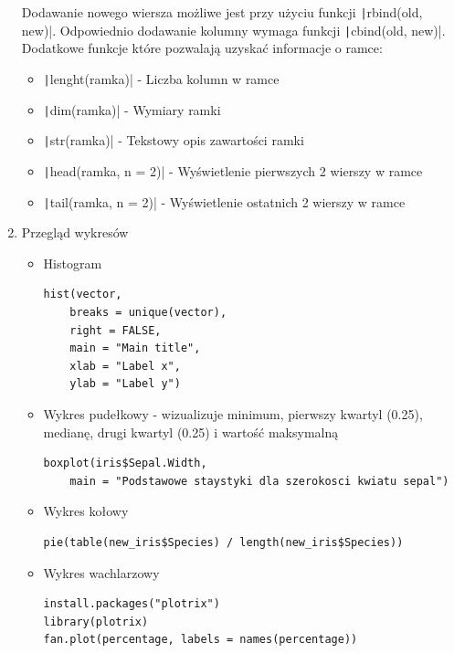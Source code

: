 \documentclass[11pt]{article}
\begin{document}
\begin{enumerate}
        Dodawanie nowego wiersza możliwe jest przy użyciu funkcji \texttt|rbind(old, new)|.
        Odpowiednio dodawanie kolumny wymaga funkcji \texttt|cbind(old, new)|. \\
        Dodatkowe funkcje które pozwalają uzyskać informacje o ramce:
        \begin{itemize}
        	\item \texttt|lenght(ramka)| - Liczba kolumn w ramce
        	\item \texttt|dim(ramka)| - Wymiary ramki
        	\item \texttt|str(ramka)| - Tekstowy opis zawartości ramki
        	\item \texttt|head(ramka, n = 2)| - Wyświetlenie pierwszych 2 wierszy w ramce
        	\item \texttt|tail(ramka, n = 2)| - Wyświetlenie ostatnich 2 wierszy w ramce
        \end{itemize}
        \clearpage
        \item Przegląd wykresów
        \begin{itemize}
        	\item Histogram 
        	\begin{verbatim}
hist(vector,
	breaks = unique(vector),
	right = FALSE, 
	main = "Main title", 
	xlab = "Label x", 
	ylab = "Label y")
        	\end{verbatim}
        	
        	\item Wykres pudełkowy - wizualizuje minimum, pierwszy kwartyl (0.25), medianę, drugi kwartyl (0.25) i wartość maksymalną
        	\begin{verbatim}
boxplot(iris$Sepal.Width,
	main = "Podstawowe staystyki dla szerokosci kwiatu sepal")
        	\end{verbatim}
        	
        	\item Wykres kołowy
        	\begin{verbatim}
pie(table(new_iris$Species) / length(new_iris$Species))
        	\end{verbatim}
        	
        	\item Wykres wachlarzowy
        	\begin{verbatim}
install.packages("plotrix")
library(plotrix)
fan.plot(percentage, labels = names(percentage))
        	\end{verbatim}
        	

\end{itemize}
\end{enumerate}
\end{document}
